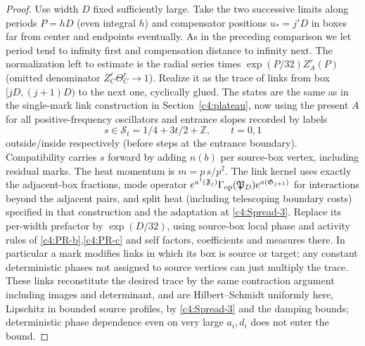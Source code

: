 \begin{proof}
Use width \(D\) fixed sufficiently large. Take the two successive limits along periods \(P=hD\) (even integral \(h\)) and compensator positions \(u_*=j'D\) in boxes far from center and endpoints eventually. As in the preceding comparison we let period tend to infinity first and compensation distance to infinity next. The normalization left to estimate is the radial series times \(\exp(P/32)Z_A^r(P)\) (omitted denominator \(Z_C^r\Theta_C^r\to1\)). Realize it as the trace of links from box \([jD,(j+1)D)\) to the next one, cyclically glued. The states are the same as in the single-mark link construction in Section~\ref{c4:plateau}, now using the present \(A\) for all positive-frequency oscillators and entrance slopes recorded by labels
\[
 s\in\mathcal S_t=1/4+3t/2+\mathbb Z,\qquad t=0,1
\]
outside/inside respectively (before steps at the entrance boundary). Compatibility carries \(s\) forward by adding \(n(b)\) per source-box vertex, including residual marks. The heat momentum is \(m=p\,s/p^2\). The link kernel uses exactly the adjacent-box fractions, mode operator \(e^{a^\dagger(\mathfrak F_j)}\Gamma_{\rm op}(\mathfrak P_D)e^{a(\mathfrak G_{j+1})}\) for interactions beyond the adjacent pairs, and split heat (including telescoping boundary costs) specified in that construction and the adaptation at \eqref{c4:Spread-3}. Replace its per-width prefactor by \(\exp(D/32)\), using source-box local phase and activity rules of \eqref{c4:PR-b},\eqref{c4:PR-c} and self factors, coefficients and measures there. In particular a mark modifies links in which its box is source or target; any constant deterministic phases not assigned to source vertices can just multiply the trace. These links reconstitute the desired trace by the same contraction argument including images and determinant, and are Hilbert--Schmidt uniformly here, Lipschitz in bounded source profiles, by \eqref{c4:Spread-3} and the damping bounds; deterministic phase dependence even on very large \(a_i,d_i\) does not enter the bound.


\end{proof}
